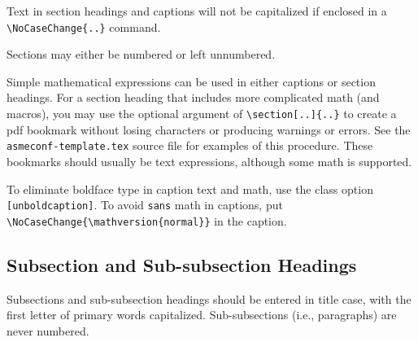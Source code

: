\documentclass[captionpatch,colorlinks,upint,subscriptcorrection,varvw,mathalfa=cal=boondoxo,german]{asmeconf}
\begin{document}
Text in section headings and captions will not be capitalized if enclosed in a \verb|\NoCaseChange{..}| command.

Sections may either be numbered or left unnumbered.

Simple mathematical expressions can be used in either captions or section headings. For a section heading that includes more complicated math (and macros), you may use the optional argument of \verb|\section[..]{..}| to create a pdf bookmark without losing characters or producing warnings or errors. See the \texttt{asmeconf-template.tex} source file for examples of this procedure. These bookmarks should usually be text expressions, although some math is supported.  

To eliminate boldface type in caption text and math, use the class option \texttt{[unboldcaption]}.  To avoid \texttt{sans} math in captions, put \verb|\NoCaseChange{\mathversion{normal}}| in the caption.

\subsection{Subsection and Sub-subsection Headings}

Subsections and sub-subsection headings should be entered in title case, with the first letter of primary words capitalized. Sub-subsections (i.e., paragraphs) are never numbered.




\begin{table}[t]
\caption[Table]{A simple table}\label{tab:1}
\end{table}

\end{document}

